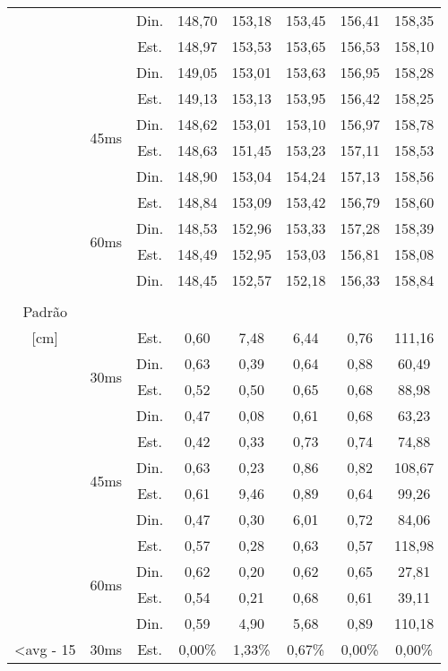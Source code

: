 \begin{center}
\begin{longtable}{|c|c|c|ccccc|}
 &  & Din. & 148,70 & 153,18 & 153,45 & 156,41 & 158,35 \\
 &  & Est. & 148,97 & 153,53 & 153,65 & 156,53 & 158,10 \\
 &  & Din. & 149,05 & 153,01 & 153,63 & 156,95 & 158,28 \\ \cline{2-8} 
 & \multirow{4}{*}{45ms} & Est. & 149,13 & 153,13 & 153,95 & 156,42 & 158,25 \\
 &  & Din. & 148,62 & 153,01 & 153,10 & 156,97 & 158,78 \\
 &  & Est. & 148,63 & 151,45 & 153,23 & 157,11 & 158,53 \\
 &  & Din. & 148,90 & 153,04 & 154,24 & 157,13 & 158,56 \\ \cline{2-8} 
 & \multirow{4}{*}{60ms} & Est. & 148,84 & 153,09 & 153,42 & 156,79 & 158,60 \\
 &  & Din. & 148,53 & 152,96 & 153,33 & 157,28 & 158,39 \\
 &  & Est. & 148,49 & 152,95 & 153,03 & 156,81 & 158,08 \\
 &  & Din. & 148,45 & 152,57 & 152,18 & 156,33 & 158,84 \\ \hline \pagebreak
\multirow{12}{*}{\begin{tabular}[c]{@{}c@{}}Desvio\\ Padrão\\ {[}cm{]}\end{tabular}} & \multirow{4}{*}{30ms} & Est. & 0,60 & 7,48 & 6,44 & 0,76 & 111,16 \\
 &  & Din. & 0,63 & 0,39 & 0,64 & 0,88 & 60,49 \\
 &  & Est. & 0,52 & 0,50 & 0,65 & 0,68 & 88,98 \\
 &  & Din. & 0,47 & 0,08 & 0,61 & 0,68 & 63,23 \\ \cline{2-8} 
 & \multirow{4}{*}{45ms} & Est. & 0,42 & 0,33 & 0,73 & 0,74 & 74,88 \\
 &  & Din. & 0,63 & 0,23 & 0,86 & 0,82 & 108,67 \\
 &  & Est. & 0,61 & 9,46 & 0,89 & 0,64 & 99,26 \\
 &  & Din. & 0,47 & 0,30 & 6,01 & 0,72 & 84,06 \\ \cline{2-8} 
 & \multirow{4}{*}{60ms} & Est. & 0,57 & 0,28 & 0,63 & 0,57 & 118,98 \\
 &  & Din. & 0,62 & 0,20 & 0,62 & 0,65 & 27,81 \\
 &  & Est. & 0,54 & 0,21 & 0,68 & 0,61 & 39,11 \\
 &  & Din. & 0,59 & 4,90 & 5,68 & 0,89 & 110,18 \\ \hline
\multirow{12}{*}{\textless avg - 15} & \multirow{4}{*}{30ms} & Est. & 0,00\% & 1,33\% & 0,67\% & 0,00\% & 0,00\% \\

\end{longtable}
\end{center}

